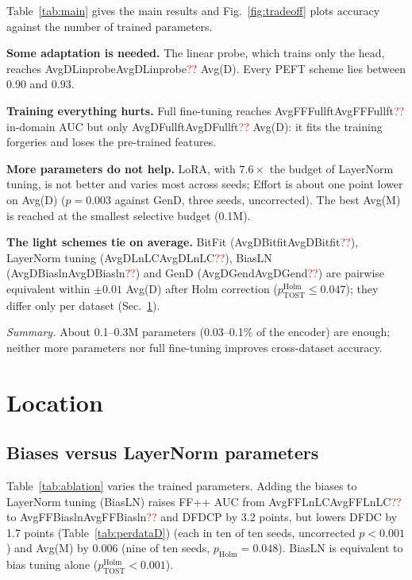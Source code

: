 \documentclass[fonts]{icst}
\newcommand{\num}[1]{\ifcsname #1\endcsname\csname #1\endcsname\else\textcolor{red}{??}\fi}
\begin{document}
\begin{table}[!t]
\centering
\caption{Ablation of selective and low-rank schemes and of $L_2$ normalization before the classifier (same protocol). Bold: best; shaded: second best.}
\label{tab:ablation}
\resizebox{0.85\textwidth}{!}{}
\end{table}


Table~\ref{tab:main} gives the main results and Fig.~\ref{fig:tradeoff} plots accuracy against the number of trained parameters.

\textbf{Some adaptation is needed.} The linear probe, which trains only the head, reaches \num{AvgDLinprobe} Avg(D). Every PEFT scheme lies between 0.90 and 0.93.

\textbf{Training everything hurts.} Full fine-tuning reaches \num{AvgFFFullft} in-domain AUC but only \num{AvgDFullft} Avg(D): it fits the training forgeries and loses the pre-trained features.


\textbf{More parameters do not help.} LoRA, with $7.6\times$ the budget of LayerNorm tuning, is not better and varies most across seeds; Effort is about one point lower on Avg(D) ($p=0.003$ against GenD, three seeds, uncorrected). The best Avg(M) is reached at the smallest selective budget (0.1M).

\textbf{The light schemes tie on average.} BitFit (\num{AvgDBitfit}), LayerNorm tuning (\num{AvgDLnLC}), BiasLN (\num{AvgDBiasln}) and GenD (\num{AvgDGend}) are pairwise equivalent within $\pm0.01$ Avg(D) after Holm correction ($p^{\mathrm{Holm}}_{\mathrm{TOST}}\le0.047$); they differ only per dataset (Sec.~\ref{sec:ablation}).




\textit{Summary.} About 0.1--0.3M parameters (0.03--0.1\% of the encoder) are enough; neither more parameters nor full fine-tuning improves cross-dataset accuracy.

\section{Location}
\label{sec:ablation}



\subsection{Biases versus LayerNorm parameters}
Table~\ref{tab:ablation} varies the trained parameters. Adding the biases to LayerNorm tuning (BiasLN) raises FF++ AUC from \num{AvgFFLnLC} to \num{AvgFFBiasln} and DFDCP by 3.2 points, but lowers DFDC by 1.7 points (Table~\ref{tab:perdataD}) (each in ten of ten seeds, uncorrected $p<0.001$) and Avg(M) by 0.006 (nine of ten seeds, $p_{\mathrm{Holm}}=0.048$). BiasLN is equivalent to bias tuning alone ($p^{\mathrm{Holm}}_{\mathrm{TOST}}<0.001$).
\end{document}
